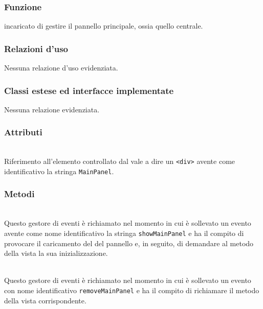 
\subsubsection*{Funzione}
 incaricato di gestire il pannello principale, ossia quello centrale.

\subsubsection*{Relazioni d'uso}
Nessuna relazione d'uso evidenziata.

\subsubsection*{Classi estese ed interfacce implementate}
Nessuna relazione evidenziata.

\subsubsection*{Attributi}
\begin{description}
\item{}\\
  Riferimento all'elemento controllato dal  vale a dire un \verb'<div>' avente come identificativo la stringa \verb'MainPanel'.
\end{description}

\subsubsection*{Metodi}
\begin{description}
  \item{}\\
  Questo gestore di eventi è richiamato nel momento in cui è sollevato un evento avente come nome identificativo la stringa \texttt{showMainPanel} e ha il compito di provocare il caricamento del  del pannello e, in seguito, di demandare al metodo  della vista la sua inizializzazione.
  
  \item{}\\
  Questo gestore di eventi è richiamato nel momento in cui è sollevato un evento con nome identificativo \texttt{removeMainPanel} e ha il compito di richiamare il metodo  della vista corrispondente.

\end{description}

